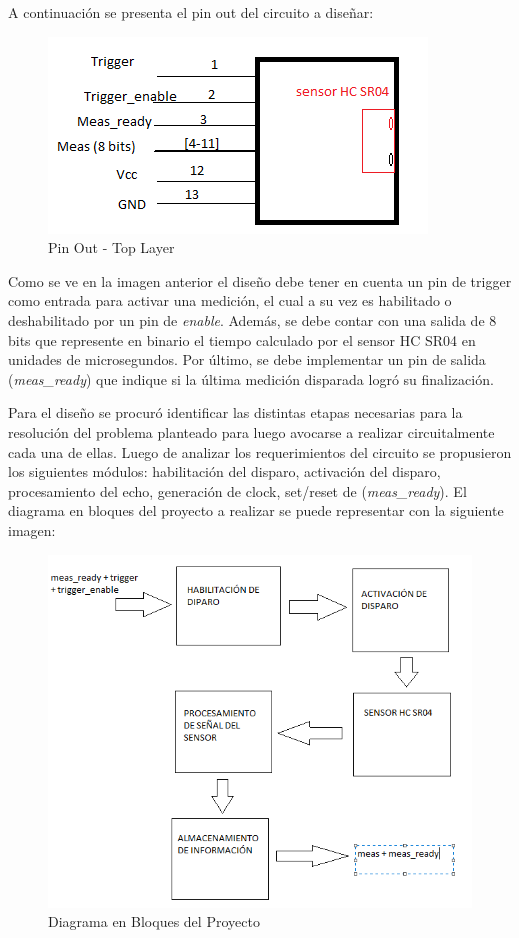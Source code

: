A continuación se presenta el pin out del circuito a diseñar:

\begin{figure}[H]
\centering
\includegraphics[scale=0.6]{pinOutGenerico.PNG}
\caption{Pin Out - Top Layer}
\end{figure}

Como se ve en la imagen anterior el diseño debe tener en cuenta un
pin de trigger como entrada para activar una medición, el cual a su
vez es habilitado o deshabilitado por un pin de \textit{enable}. Además,
se debe contar con una salida de 8 bits que represente en binario
el tiempo calculado por el sensor HC SR04 en unidades de microsegundos.
Por último, se debe implementar un pin de salida (\textit{meas\_ready})
que indique si la última medición disparada logró su finalización. 

Para el diseño se procuró identificar las distintas etapas necesarias
para la resolución del problema planteado para luego avocarse a realizar
circuitalmente cada una de ellas. Luego de analizar los requerimientos
del circuito se propusieron los siguientes módulos: habilitación del
disparo, activación del disparo, procesamiento del echo, generación
de clock, set/reset de (\textit{meas\_ready}). El diagrama en bloques del
proyecto a realizar se puede representar con la siguiente imagen:

\begin{figure}[H]
\centering
\includegraphics[scale=0.5]{diagramaDeBloquesGenerico.PNG}
\caption{Diagrama en Bloques del Proyecto}
\end{figure}

